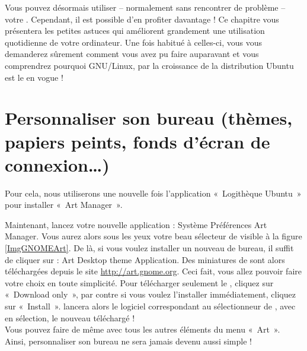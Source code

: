  {Vous pouvez désormais utiliser}{ -- normalement sans rencontrer de problème -- votre . Cependant, il est possible d'en profiter davantage ! Ce chapitre vous présentera les petites astuces qui améliorent grandement une utilisation quotidienne de votre ordinateur. Une fois habitué à celles-ci, vous vous demanderez sûrement comment vous avez pu faire auparavant et vous comprendrez pourquoi GNU/Linux, par la croissance de la distribution Ubuntu est le  en vogue !}
\label{ChapitreMieuxUtiliserGnome}
\section{Personnaliser son bureau (thèmes, papiers peints, fonds d'écran de connexion\ldots{})}
\label{RefInstallTheme}
Pour cela, nous utiliserons une nouvelle fois l'application «~Logithèque Ubuntu~» pour installer «~Art Manager~».\par
{}
Maintenant, lancez votre nouvelle application : Système \FlecheDroite Préférences \FlecheDroite Art Manager. Vous aurez alors sous les yeux votre beau sélecteur de  visible à la figure \ref{ImgGNOMEArt}. De là, si vous voulez installer un nouveau  de bureau, il suffit de cliquer sur : Art \FlecheDroite Desktop theme \FlecheDroite Application. Des miniatures de  sont alors téléchargées depuis le site \url{http://art.gnome.org}. Ceci fait, vous allez pouvoir faire votre choix en toute simplicité. Pour télécharger seulement le , cliquez sur «~Download only~», par contre si vous voulez l'installer immédiatement, cliquez sur «~Install~».  lancera alors le logiciel correspondant au sélectionneur de , avec en sélection, le nouveau  téléchargé !\\
Vous pouvez faire de même avec tous les autres éléments du menu «~Art~». Ainsi, personnaliser son bureau ne sera jamais devenu aussi simple !
